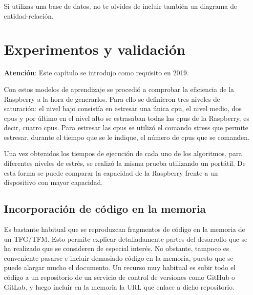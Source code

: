 \documentclass[a4paper, 12pt]{book}
\begin{document}
Si utilizas una base de datos, no te olvides de incluir también un diagrama de entidad-relación.

\cleardoublepage


\chapter{Experimentos y validación}
\label{chap:experimentos}

\textbf{Atención}: Este capítulo se introdujo como requisito en 2019.

Con estos modelos de aprendizaje se procedió a comprobar la eficiencia de la Raspberry a la hora de generarlos. Para ello se definieron tres niveles de saturación: el nivel bajo consistía en estresar una única cpu, el nivel medio, dos cpus y por último en el nivel alto se estrasaban todas las cpus de la Raspberry, es decir, cuatro cpus. 
Para estresar las cpus se utilizó el comando stress que permite estresar, durante el tiempo que se le indique, el número de cpus que se comanden.

Una vez obtenidos los tiempos de ejecución de cada uno de los algoritmos, para diferentes niveles de estrés, se realizó la misma prueba utilizando un portátil. De esta forma se puede comparar la capacidad de la Raspberry frente a un dispositivo con mayor capacidad.
 
\section{Incorporación de código en la memoria}

Es bastante habitual que se reproduzcan fragmentos de código en la memoria de un TFG/TFM.
Esto permite explicar detalladamente partes del desarrollo que se ha realizado que se consideren
de especial interés. No obstante, tampoco es conveniente pasarse e incluir demasiado código en
la memoria, puesto que se puede alargar mucho el documento. Un recurso muy habitual es subir
todo el código a un repositorio de un servicio de control de versiones como GitHub o GitLab,
y luego incluir en la memoria la URL que enlace a dicho repositorio.
\end{document}
